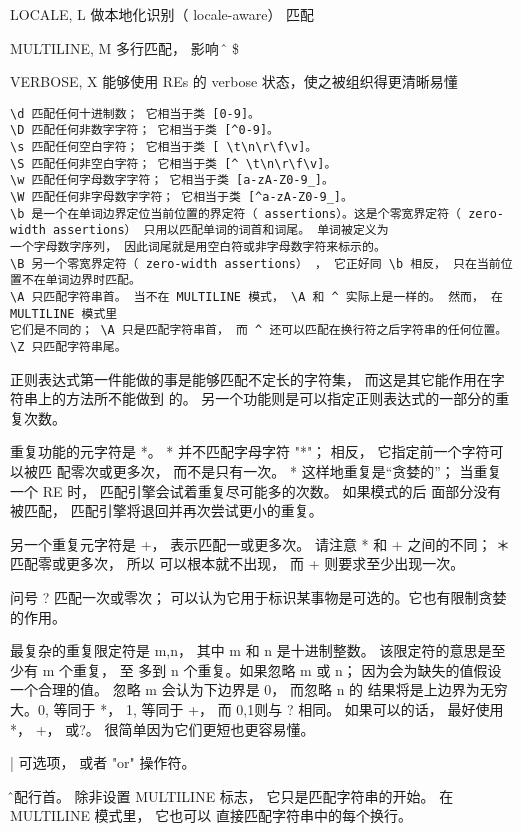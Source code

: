 \documentclass[twoside,11pt]{book}
\begin{document}
LOCALE, L 做本地化识别（ locale-aware） 匹配

MULTILINE, M 多行匹配， 影响 \^ 和 \$

VERBOSE, X 能够使用 REs 的 verbose 状态，使之被组织得更清晰易懂

\begin{lstlisting}
\d 匹配任何十进制数； 它相当于类 [0-9]。
\D 匹配任何非数字字符； 它相当于类 [^0-9]。
\s 匹配任何空白字符； 它相当于类 [ \t\n\r\f\v]。
\S 匹配任何非空白字符； 它相当于类 [^ \t\n\r\f\v]。
\w 匹配任何字母数字字符； 它相当于类 [a-zA-Z0-9_]。
\W 匹配任何非字母数字字符； 它相当于类 [^a-zA-Z0-9_]。
\b 是一个在单词边界定位当前位置的界定符（ assertions）。这是个零宽界定符（ zero-width assertions） 只用以匹配单词的词首和词尾。 单词被定义为
一个字母数字序列， 因此词尾就是用空白符或非字母数字符来标示的。
\B 另一个零宽界定符（ zero-width assertions） ， 它正好同 \b 相反， 只在当前位置不在单词边界时匹配。
\A 只匹配字符串首。 当不在 MULTILINE 模式， \A 和 ^ 实际上是一样的。 然而， 在 MULTILINE 模式里
它们是不同的； \A 只是匹配字符串首， 而 ^ 还可以匹配在换行符之后字符串的任何位置。
\Z 只匹配字符串尾。
\end{lstlisting}

正则表达式第一件能做的事是能够匹配不定长的字符集， 而这是其它能作用在字符串上的方法所不能做到
的。 另一个功能则是可以指定正则表达式的一部分的重复次数。

重复功能的元字符是 *。 * 并不匹配字母字符 "*"； 相反， 它指定前一个字符可以被匹
配零次或更多次， 而不是只有一次。 * 这样地重复是“贪婪的”； 当重复一个 RE 时， 匹配引擎会试着重复尽可能多的次数。 如果模式的后
面部分没有被匹配， 匹配引擎将退回并再次尝试更小的重复。

另一个重复元字符是 +， 表示匹配一或更多次。 请注意 * 和 + 之间的不同； ＊ 匹配零或更多次， 所以
可以根本就不出现， 而 + 则要求至少出现一次。

问号 ? 匹配一次或零次； 可以认为它用于标识某事物是可选的。它也有限制贪婪的作用。

最复杂的重复限定符是 {m,n}， 其中 m 和 n 是十进制整数。 该限定符的意思是至少有 m 个重复， 至
多到 n 个重复。如果忽略 m 或 n； 因为会为缺失的值假设一个合理的值。 忽略 m 会认为下边界是 0， 而忽略 n 的
结果将是上边界为无穷大。{0,} 等同于 *， {1,} 等同于 +， 而
{0,1}则与 ? 相同。 如果可以的话， 最好使用 *， +， 或?。 很简单因为它们更短也更容易懂。

| 可选项， 或者 "or" 操作符。

\^ 匹配行首。 除非设置 MULTILINE 标志， 它只是匹配字符串的开始。 在 MULTILINE 模式里， 它也可以
直接匹配字符串中的每个换行。
\end{document}
